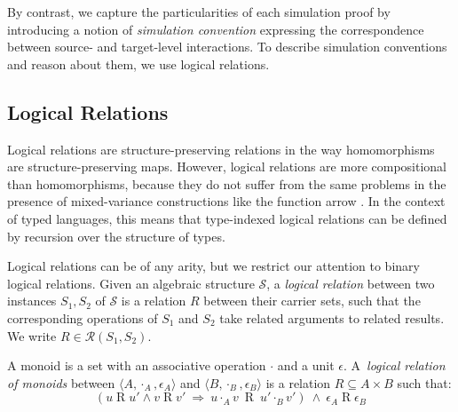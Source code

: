 \documentclass[sigplan,screen]{acmart}
\begin{document}
By contrast,
we capture the particularities of each simulation proof
by introducing a notion of \emph{simulation convention}
expressing the correspondence between
source- and target-level interactions.
To describe simulation conventions
and reason about them,
we use logical relations.



\subsection{Logical Relations} \label{sec:logrel} %

Logical relations are structure-preserving relations
in the way homomorphisms are structure-preserving maps.
However,
logical relations are more compositional than homomorphisms,
because they do not suffer from the same problems
in the presence of mixed-variance constructions
like the function arrow %
\cite{lrp}.
In the context of typed languages,
this means that type-indexed logical relations
can be defined by recursion over the structure of types.


Logical relations can be of any arity,
but
we restrict our attention to
binary logical relations.
Given an algebraic structure $\mathcal{S}$,
a \emph{logical relation}
between two instances $S_1, S_2$ of $\mathcal{S}$
is a relation $R$
between their carrier sets,
such that the corresponding operations of $S_1$ and $S_2$
take related arguments to related results.
We write $R \in \mathcal{R}(S_1, S_2)$.

\begin{example}%
\label{ex:monoid}
A monoid is a set with
an associative operation $\cdot$ and
a unit $\epsilon$.
A~\emph{logical relation of monoids} between
$\langle A, \cdot_A, \epsilon_A \rangle$ and
$\langle B, \cdot_B, \epsilon_B \rangle$
is a relation $R \subseteq A \times B$
such that:
\begin{equation}
\label{eqn:monoidrel}
(u \mathrel{R} u' \wedge v \mathrel{R} v' \: \Rightarrow \:
 u \cdot_A v \: \mathrel{R} \: u' \cdot_B v')
\: \wedge \:
\epsilon_A \mathrel{R} \epsilon_B
\end{equation}
\end{example}
\end{document}
